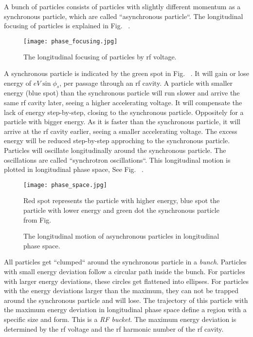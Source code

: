 A bunch of particles consists of particles with slightly different momentum as a synchronous particle, which are called ``asynchronous particle``. The longitudinal focusing of particles is explained in Fig. ~\label{phase_focusing}. 
\begin{figure}[!htb]
   \centering   
   \texttt{[image: phase\_focusing.jpg]}
   \caption{The longitudinal focusing of particles by rf voltage.}
   \label{phase_focusing}
\end{figure}
A synchronous particle is indicated by the green spot in Fig. ~\label{phase_focusing}. It will gain or lose energy of $eV\sin\phi_{\mathit{s}}$, per passage through an rf cavity. A particle with smaller energy (blue spot) than the synchronous particle will run slower and arrive the same rf cavity later, seeing a higher accelerating voltage. It will compensate the lack of energy step-by-step, closing to the synchronous particle. Oppositely for a particle with bigger energy. As it is faster than the synchronous particle, it will arrive at the rf cavity earlier, seeing a smaller accelerating voltage. The excess energy will be reduced step-by-step approching to the synchronous particle. Particles will oscillate longitudinally around the synchronous particle. The oscillations are called ``synchrotron oscillations``. This longitudinal motion is plotted in longitudinal phase space, See Fig. ~\label{phase_space}.
\begin{figure}[!htb]
   \centering   
   \texttt{[image: phase\_space.jpg]}
   \caption{The longitudinal motion of asynchronous particles in longitudinal phase space.}{Red spot represents the particle with higher energy, blue spot the particle with lower energy and green dot the synchronous particle from Fig. ~\label{phase_focusing}}
   \label{phase_space}
\end{figure}

All particles get ``clumped`` around the synchronous particle in a \emph{bunch}. Particles with small energy deviation follow a circular path inside the bunch. For particles with larger energy deviations, these circles get flattened into ellipses. For particles with the energy deviations larger than the maximum, they can not be trapped around the synchronous particle and will lose. The trajectory of this particle with the maximum energy deviation in longitudinal phase space define a region with a specific size and form. This is a \emph{RF bucket}. The maximum energy deviation is determined by the rf voltage and the rf harmonic number of the rf cavity.

